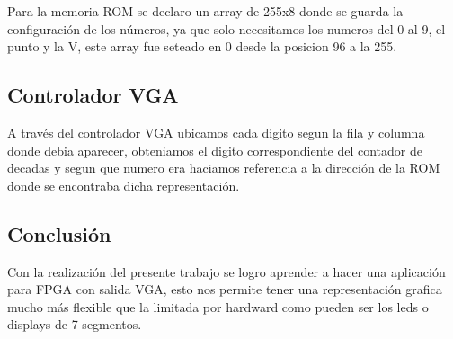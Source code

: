\documentclass{article}
\begin{document}
Para la memoria ROM se declaro un array de 255x8 donde se guarda la configuración de los números, ya que solo necesitamos los numeros del 0 al 9, el punto y la V, este array fue seteado en 0 desde la posicion 96 a la 255.

\subsection{Controlador VGA}

A través del controlador VGA ubicamos cada digito segun la fila y columna donde debia aparecer, obteniamos el digito correspondiente del contador de decadas y segun que numero era haciamos referencia a la dirección de la ROM donde se encontraba dicha representación.

\subsection{Conclusión}

Con la realización del presente trabajo se logro aprender a hacer una aplicación para FPGA con salida VGA, esto nos permite tener una representación grafica mucho más flexible que la limitada por hardward como pueden ser los leds o displays de 7 segmentos.
\end{document}
